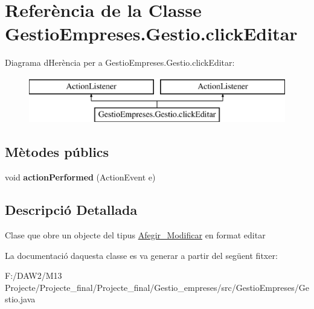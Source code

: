 \hypertarget{class_gestio_empreses_1_1_gestio_1_1click_editar}{}\section{Referència de la Classe Gestio\+Empreses.\+Gestio.\+click\+Editar}
\label{class_gestio_empreses_1_1_gestio_1_1click_editar}
Diagrama d\textquotesingle{}Herència per a Gestio\+Empreses.\+Gestio.\+click\+Editar\+:\begin{figure}[H]
\begin{center}
\leavevmode
\includegraphics[height=2.000000cm]{class_gestio_empreses_1_1_gestio_1_1click_editar}
\end{center}
\end{figure}
\subsection*{Mètodes públics}
\begin{DoxyCompactItemize}
\item 
\mbox{\label{class_gestio_empreses_1_1_gestio_1_1click_editar_a995ad7359066a18e290a7d465a6af0c0}} 
void {\bfseries action\+Performed} (Action\+Event e)
\end{DoxyCompactItemize}


\subsection{Descripció Detallada}
Clase que obre un objecte del tipus \mbox{\hyperlink{class_gestio_empreses_1_1_afegir___modificar}{Afegir\+\_\+\+Modificar}} en format editar 

La documentació d\textquotesingle{}aquesta classe es va generar a partir del següent fitxer\+:\begin{DoxyCompactItemize}
\item 
F\+:/\+D\+A\+W2/\+M13 Projecte/\+Projecte\+\_\+final/\+Projecte\+\_\+final/\+Gestio\+\_\+empreses/src/\+Gestio\+Empreses/Gestio.\+java\end{DoxyCompactItemize}
